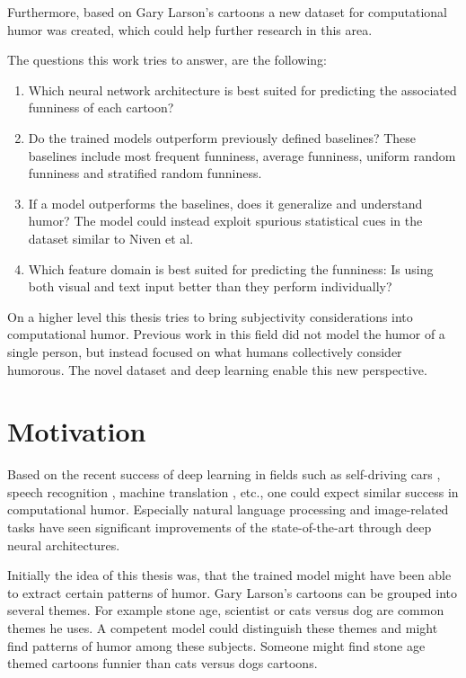 \documentclass[draft,final,oneside]{vutinfth} %
\begin{document}
Furthermore, based on Gary Larson's cartoons a new dataset for computational humor was created, which could help further research in this area.

The questions this work tries to answer, are the following:

\begin{enumerate}

\item Which neural network architecture is best suited for predicting the associated funniness of each cartoon?

\item Do the trained models outperform previously defined baselines? These baselines include most frequent funniness, average funniness, uniform random funniness and stratified random funniness.

\item If a model outperforms the baselines, does it generalize and understand humor? The model could instead exploit spurious statistical cues in the dataset similar to Niven et al. \cite{cleverhans}

\item Which feature domain is best suited for predicting the funniness: Is using both visual and text input better than they perform individually?

\end{enumerate}

On a higher level this thesis tries to bring subjectivity considerations into computational humor. Previous work in this field did not model the humor of a single person, but instead focused on what humans collectively consider humorous. The novel dataset and deep learning enable this new perspective.

\section{Motivation}

Based on the recent success of deep learning in fields such as self-driving cars \cite{selfdriving}, speech recognition \cite{speech}, machine translation \cite{nmt}, etc., one could expect similar success in computational humor. Especially natural language processing and image-related tasks have seen significant improvements of the state-of-the-art through deep neural architectures.

Initially the idea of this thesis was, that the trained model might have been able to extract certain patterns of humor. Gary Larson's cartoons can be grouped into several themes. For example stone age, scientist or cats versus dog are common themes he uses. A competent model could distinguish these themes and might find patterns of humor among these subjects. Someone might find stone age themed cartoons funnier than cats versus dogs cartoons. 
\end{document}
